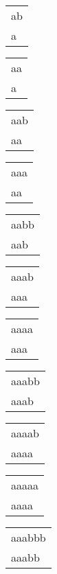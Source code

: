\begin{description}
\begin{tabular}{|l|}
\hline
\end{tabular} 
\begin{tabular}{|l|} \hline
ab \\
a\  \\
\hline
\end{tabular} 
\begin{tabular}{|l|} \hline
aa \\
a\  \\
\hline
\end{tabular} 
\begin{tabular}{|l|} \hline
aab \\
aa\  \\
\hline
\end{tabular} 
\begin{tabular}{|l|} \hline
aaa \\
aa\  \\
\hline
\end{tabular} 
\begin{tabular}{|l|} \hline
aabb \\
aab\  \\
\hline
\end{tabular} 
\begin{tabular}{|l|} \hline
aaab \\
aaa\  \\
\hline
\end{tabular} 
\begin{tabular}{|l|} \hline
aaaa \\
aaa\  \\
\hline
\end{tabular} 
\begin{tabular}{|l|} \hline
aaabb \\
aaab\  \\
\hline
\end{tabular} 
\begin{tabular}{|l|} \hline
aaaab \\
aaaa\  \\
\hline
\end{tabular} 
\begin{tabular}{|l|} \hline
aaaaa \\
aaaa\  \\
\hline
\end{tabular} 
\begin{tabular}{|l|} \hline
aaabbb \\
aaabb\  \\
\hline
\end{tabular} 
\begin{tabular}{|l|} \hline

\end{tabular}
\end{description}
